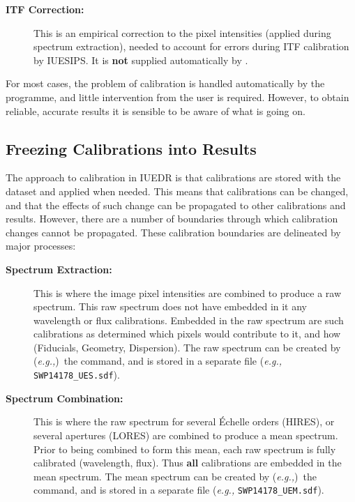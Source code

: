 \begin{description}
\item [{\bf ITF Correction:}]
      This is an empirical correction to the pixel
      intensities (applied during spectrum extraction), needed to account for
      errors during ITF calibration by IUESIPS.  It is {\bf not} supplied
      automatically by \@.

\end{description}

For most cases, the problem of calibration is handled automatically by the
programme, and little intervention from the user is required.  However, to
obtain reliable, accurate results it is sensible to be aware of what is
going on.


\subsection{Freezing Calibrations into Results}

The approach to calibration in IUEDR is that calibrations are stored with
the dataset and applied when needed.  This means that calibrations
can be changed, and that the effects of such change can be propagated to
other calibrations and results.  However, there are a number of boundaries
through which calibration changes cannot be propagated.  These
calibration boundaries are delineated by major processes:

\begin{description}

\item [{\bf Spectrum Extraction:}]
      This is where the image pixel intensities are
      combined to produce a raw spectrum.  This raw spectrum does not have
      embedded in it any wavelength or flux calibrations.  Embedded in
      the raw spectrum are such calibrations as determined which pixels would
      contribute to it, and how (Fiducials, Geometry, Dispersion)\@.  The raw
      spectrum can be created by ({\it{e.g.,}})\ the
       command, and
      is stored in a separate file ({\it{e.g.,}} \verb+SWP14178_UES.sdf+)\@.

\item [{\bf Spectrum Combination:}]
      This is where the raw spectrum for several
      \'{E}chelle orders (HIRES), or several apertures (LORES) are combined to
      produce a mean spectrum.  Prior to being combined to form this mean,
      each raw spectrum is fully calibrated (wavelength, flux)\@.  Thus
      {\bf all} calibrations are embedded in the mean spectrum.  The mean
      spectrum can be created by ({\it{e.g.,}})\ the 
      command, and is stored in a separate file ({\it{e.g.,}}
      \verb+SWP14178_UEM.sdf+)\@.

\end{description}


